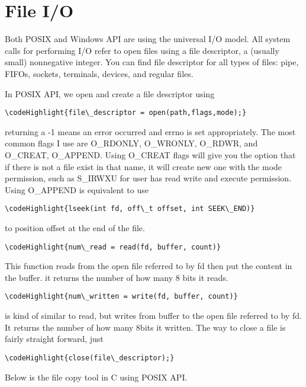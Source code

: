 \documentclass[letterpaper,12pt,titlepage]{article}
\newcommand\codeHighlight[1]{\textcolor[rgb]{1,0,0}{\textbf{#1}}}
\begin{document}
\section*{File I/O}
Both POSIX and Windows API are using the universal I/O model. All system calls for performing I/O refer to open files using a file descriptor, a (usually small) nonnegative integer. You can find file descriptor for all types of files: pipe, FIFOs, sockets, terminals, devices, and regular files.\par
In POSIX API, we open and create a file descriptor using
\begin{Verbatim}[commandchars=\\\{\}]
\codeHighlight{file\_descriptor = open(path,flags,mode);}
\end{Verbatim}
returning a -1 means an error occurred and errno is set appropriately. The most common flags I use are O\_RDONLY, O\_WRONLY, O\_RDWR, and O\_CREAT, O\_APPEND. Using O\_CREAT flags will give you the option that if there is not a file exist in that name, it will create new one with the mode permission, such as S\_IRWXU for user has read write and execute permission. Using O\_APPEND is equivalent to use 
\begin{Verbatim}[commandchars=\\\{\}]
\codeHighlight{lseek(int fd, off\_t offset, int SEEK\_END)}
\end{Verbatim}
to position offset at the end of the file. 
\begin{Verbatim}[commandchars=\\\{\}]
\codeHighlight{num\_read = read(fd, buffer, count)}
\end{Verbatim}
This function reads from the open file referred to by fd then put the content in the buffer. it returns the number of how many 8 bits it reads.
\begin{Verbatim}[commandchars=\\\{\}]
\codeHighlight{num\_written = write(fd, buffer, count)}
\end{Verbatim} 
is kind of similar to read, but writes from buffer to the open file referred to by fd. It returns the number of how many 8bits it written. The way to close a file is fairly straight forward, just 
\begin{Verbatim}[commandchars=\\\{\}]
\codeHighlight{close(file\_descriptor);}
\end{Verbatim}
\par
Below is the file copy tool in C using POSIX API.\\
\end{document}
